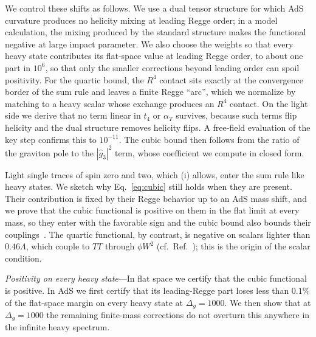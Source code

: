 \documentclass[aps,prl,twocolumn,superscriptaddress,nofootinbib,floatfix]{revtex4-2}
\begin{document}
We control these shifts as follows. We use a dual tensor structure for which AdS curvature produces no
helicity mixing at leading Regge order; in a model calculation, the mixing produced by the standard structure
makes the functional negative at large impact parameter. We also choose the weights so that every heavy state
contributes its flat-space value at leading Regge order, to about one part in $10^6$, so that only the smaller
corrections beyond leading order can spoil positivity. For the quartic bound, the $R^4$ contact sits exactly at the convergence border of the sum rule and leaves a finite Regge ``arc'',
which we normalize by matching to a heavy scalar whose exchange produces an $R^4$ contact. On the light side we
derive that no term linear in $t_4$ or $\alpha_T$ survives, because such terms flip helicity and the dual structure
removes helicity flips. A free-field evaluation of the key step confirms this to $10^{-11}$. The cubic bound then follows
from the ratio of the graviton pole to the $|\hat g_3|^2$ term, whose coefficient we compute in closed form.


Light single traces of spin zero and two, which (i) allows, enter the sum rule like heavy states. We sketch why Eq.~\eqref{eq:cubic} still holds when they are present. Their contribution is fixed by their Regge behavior up to an AdS mass shift, and we prove that the cubic functional is positive on them in the flat limit at every mass, so they enter with the favorable sign and the cubic bound also bounds their couplings~\cite{CHLPS}. The quartic functional, by contrast, is negative on scalars lighter than $0.46\Lambda$,
which couple to $TT$ through $\phi W^2$ (cf.\ Ref.~\cite{CMT}); this is the origin of the scalar condition.

\textit{Positivity on every heavy state}---In flat space we certify that the cubic functional is positive. In AdS
we first certify that its leading-Regge part loses less than $0.1\%$ of the flat-space margin on every heavy state at $\Delta_g=1000$. We then show that at $\Delta_g=1000$ the remaining finite-mass corrections do not
overturn this anywhere in the infinite heavy spectrum.
\end{document}
